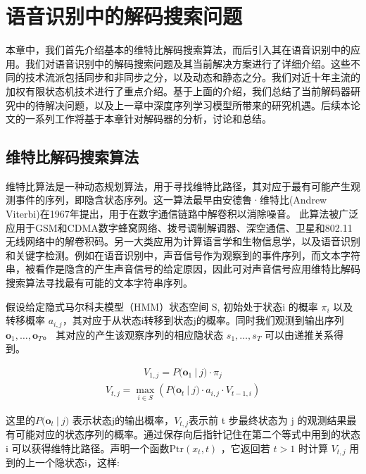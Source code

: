 
\chapter{语音识别中的解码搜索问题}
\label{chap:intro2}

本章中，我们首先介绍基本的维特比解码搜索算法，而后引入其在语音识别中的应用。我们对语音识别中的解码搜索问题及其当前解决方案进行了详细介绍。这些不同的技术流派包括同步和非同步之分，以及动态和静态之分。我们对近十年主流的加权有限状态机技术进行了重点介绍。基于上面的介绍，我们总结了当前解码器研究中的待解决问题，以及上一章中深度序列学习模型所带来的研究机遇。后续本论文的一系列工作将基于本章针对解码器的分析，讨论和总结。


\section{维特比解码搜索算法}
\label{chap:intro2-viterbi}

维特比算法是一种动态规划算法，用于寻找维特比路径，其对应于最有可能产生观测事件的序列，即隐含状态序列。这一算法最早由安德鲁·维特比(Andrew Viterbi)在1967年提出，用于在数字通信链路中解卷积以消除噪音。 此算法被广泛应用于GSM和CDMA数字蜂窝网络、拨号调制解调器、深空通信、卫星和802.11无线网络中的解卷积码。另一大类应用为计算语言学和生物信息学，以及语音识别和关键字检测。例如在语音识别中，声音信号作为观察到的事件序列，而文本字符串，被看作是隐含的产生声音信号的给定原因，因此可对声音信号应用维特比解码搜索算法寻找最有可能的文本字符串序列。

假设给定隐式马尔科夫模型（HMM）状态空间 S, 初始处于状态i 的概率 $\pi_{i}$ 以及转移概率 $a_{i,j}$，其对应于从状态i转移到状态j的概率。同时我们观测到输出序列 $\mathbf{o}_{1},\dots ,\mathbf{o}_{T}$。 其对应的产生该观察序列的相应隐状态 $s_{1},\dots ,s_{T}$ 可以由递推关系得到。

\begin{equation}
\begin{split}
V_{1,j}= {P} {\big (}\mathbf{o}_{1}\ |\ j{\big )}\cdot \pi _{j}
\end{split}
\end{equation}
\begin{equation}
\begin{split}
V_{t,j}=\max _{i\in S}\left( {P} {\big (}\mathbf{o}_{t}\ |\ j{\big )}\cdot a_{i,j}\cdot V_{t-1,i}\right)
\end{split}
\end{equation}

这里的$ {P} {\big (}\mathbf{o}_{t}\ |\ j{\big )}$ 表示状态j的输出概率，$V_{t,j}$表示前 t 步最终状态为 j 的观测结果最有可能对应的状态序列的概率。通过保存向后指针记住在第二个等式中用到的状态 i 可以获得维特比路径。声明一个函数$\mathrm {Ptr} (x_{t},t)$ ，它返回若 $t>1$ 时计算 $V_{t,j}$ 用到的上一个隐状态i，这样:

